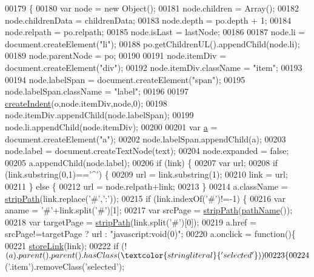 \begin{DoxyCode}
00179 \{
00180   var node = \textcolor{keyword}{new} Object();
00181   node.children = Array();
00182   node.childrenData = childrenData;
00183   node.depth = po.depth + 1;
00184   node.relpath = po.relpath;
00185   node.isLast = lastNode;
00186 
00187   node.li = document.createElement(\textcolor{stringliteral}{"li"});
00188   po.getChildrenUL().appendChild(node.li);
00189   node.parentNode = po;
00190 
00191   node.itemDiv = document.createElement(\textcolor{stringliteral}{"div"});
00192   node.itemDiv.className = \textcolor{stringliteral}{"item"};
00193 
00194   node.labelSpan = document.createElement(\textcolor{stringliteral}{"span"});
00195   node.labelSpan.className = \textcolor{stringliteral}{"label"};
00196 
00197   \hyperlink{navtree_8js_a4d8f406d49520a0cede2e48347a3d7aa}{createIndent}(o,node.itemDiv,node,0);
00198   node.itemDiv.appendChild(node.labelSpan);
00199   node.li.appendChild(node.itemDiv);
00200 
00201   var \hyperlink{jquery_8js_aa4d4888597588a84fd5b1184d00c91f3}{a} = document.createElement(\textcolor{stringliteral}{"a"});
00202   node.labelSpan.appendChild(a);
00203   node.label = document.createTextNode(text);
00204   node.expanded = \textcolor{keyword}{false};
00205   a.appendChild(node.label);
00206   \textcolor{keywordflow}{if} (link) \{
00207     var url;
00208     \textcolor{keywordflow}{if} (link.substring(0,1)==\textcolor{charliteral}{'^'}) \{
00209       url = link.substring(1);
00210       link = url;
00211     \} \textcolor{keywordflow}{else} \{
00212       url = node.relpath+link;
00213     \}
00214     a.className = \hyperlink{navtree_8js_a9336c21407bb7ced644331eb7a2a6e35}{stripPath}(link.replace(\textcolor{charliteral}{'#'},\textcolor{charliteral}{':'}));
00215     \textcolor{keywordflow}{if} (link.indexOf(\textcolor{charliteral}{'#'})!=-1) \{
00216       var aname = \textcolor{charliteral}{'#'}+link.split(\textcolor{charliteral}{'#'})[1];
00217       var srcPage = \hyperlink{navtree_8js_a9336c21407bb7ced644331eb7a2a6e35}{stripPath}(\hyperlink{navtree_8js_a364b3f4132309fa9aae78585cf2cb772}{pathName}());
00218       var targetPage = \hyperlink{navtree_8js_a9336c21407bb7ced644331eb7a2a6e35}{stripPath}(link.split(\textcolor{charliteral}{'#'})[0]);
00219       a.href = srcPage!=targetPage ? url : \textcolor{stringliteral}{"javascript:void(0)"}; 
00220       a.onclick = \textcolor{keyword}{function}()\{
00221         \hyperlink{navtree_8js_ade730323aadb971c053136b7758c9dce}{storeLink}(link);
00222         \textcolor{keywordflow}{if} (!$(a).parent().parent().hasClass(\textcolor{stringliteral}{'selected'}))
00223         \{
00224           $(\textcolor{stringliteral}{'.item'}).removeClass(\textcolor{stringliteral}{'selected'});

\end{DoxyCode}

